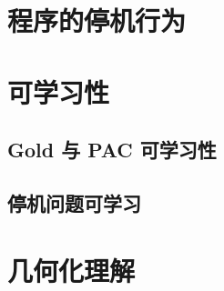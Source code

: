 \documentclass[a4paper,12pt]{article}
\numberwithin{problem}{section}
\numberwithin{definition}{section}
\numberwithin{lemma}{section}
\numberwithin{proposition}{section}
\numberwithin{theorem}{section}
\numberwithin{grammar}{section}
\numberwithin{program}{section}
\numberwithin{convention}{section}
\numberwithin{corollary}{section}
\begin{document}
\newpage

\section{程序的停机行为}

\newpage

\section{可学习性}

\subsection{Gold 与 PAC 可学习性}

\subsection{停机问题可学习}

\newpage

\section{几何化理解}

\newpage
\end{document}
